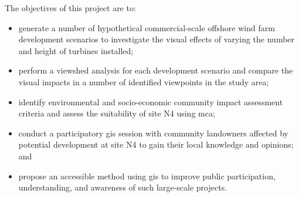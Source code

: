 \noindent The objectives of this project are to:

\begin{itemize}[noitemsep]
  \item generate a number of hypothetical commercial-scale offshore wind farm development scenarios to investigate the visual effects of varying the number and height of turbines installed;
  \item perform a viewshed analysis for each development scenario and compare the visual impacts in a number of identified viewpoints in the study area;
  \item identify environmental and socio-economic community impact assessment criteria and assess the suitability of site N4 using \gls{mca};
  \item conduct a participatory \gls{gis} session with community landowners affected by potential development at site N4 to gain their local knowledge and opinions; and
  \pagebreak
  \item propose an accessible method using \gls{gis} to improve public participation, understanding, and awareness of such large-scale projects.
\end{itemize}
